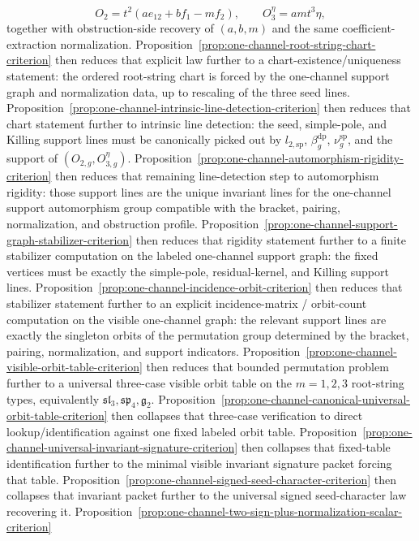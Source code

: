 \begin{remark}[Scope]
\[
O_2=t^2(ae_{12}+bf_1-mf_2),
\qquad
O_3^\eta=a m t^3\eta,
\]
together with obstruction-side recovery of $(a,b,m)$ and the same
coefficient-extraction normalization.
Proposition~\ref{prop:one-channel-root-string-chart-criterion} then
reduces that explicit law further to a chart-existence/uniqueness
statement: the ordered root-string chart is forced by the one-channel
support graph and normalization data, up to rescaling of the three seed
lines.
Proposition~\ref{prop:one-channel-intrinsic-line-detection-criterion}
then reduces that chart statement further to intrinsic line detection:
the seed, simple-pole, and Killing support lines must be canonically
picked out by $l_{2,\mathrm{sp}}$, $\beta_g^{\mathrm{dp}}$,
$\nu_g^{\mathrm{sp}}$, and the support of
$(O_{2,g},O_{3,g}^\eta)$.
Proposition~\ref{prop:one-channel-automorphism-rigidity-criterion}
then reduces that remaining line-detection step to automorphism
rigidity: those support lines are the unique invariant lines for the
one-channel support automorphism group compatible with the bracket,
pairing, normalization, and obstruction profile.
Proposition~\ref{prop:one-channel-support-graph-stabilizer-criterion}
then reduces that rigidity statement further to a finite stabilizer
computation on the labeled one-channel support graph: the fixed
vertices must be exactly the simple-pole, residual-kernel, and Killing
support lines.
Proposition~\ref{prop:one-channel-incidence-orbit-criterion}
then reduces that stabilizer statement further to an explicit
incidence-matrix / orbit-count computation on the visible one-channel
graph: the relevant support lines are exactly the singleton orbits of
the permutation group determined by the bracket, pairing,
normalization, and support indicators.
Proposition~\ref{prop:one-channel-visible-orbit-table-criterion}
then reduces that bounded permutation problem further to a universal
three-case visible orbit table on the
$m=1,2,3$ root-string types, equivalently
$\mathfrak{sl}_3,\mathfrak{sp}_4,\mathfrak{g}_2$.
Proposition~\ref{prop:one-channel-canonical-universal-orbit-table-criterion}
then collapses that three-case verification to direct
lookup/identification against one fixed labeled orbit table.
Proposition~\ref{prop:one-channel-universal-invariant-signature-criterion}
then collapses that fixed-table identification further to the minimal
visible invariant signature packet forcing that table.
Proposition~\ref{prop:one-channel-signed-seed-character-criterion}
then collapses that invariant packet further to the universal signed
seed-character law recovering it.
Proposition~\ref{prop:one-channel-two-sign-plus-normalization-scalar-criterion}

\end{remark}
